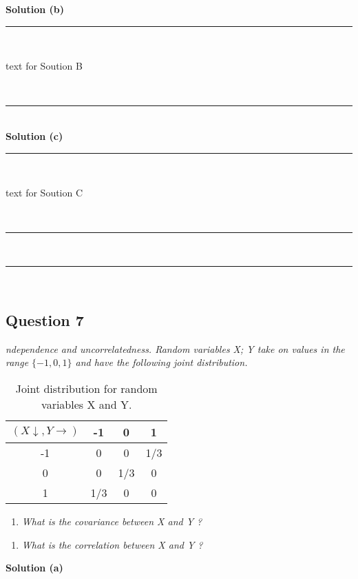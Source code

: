 \documentclass{article}
\begin{document}
\textbf{Solution (b)}

\noindent\rule{\textwidth}{0.4pt}\\

\parbox{\textwidth}{text for Soution B}\\

\noindent\rule{\textwidth}{0.4pt}\\

\textbf{Solution (c)}

\noindent\rule{\textwidth}{0.4pt}\\

\parbox{\textwidth}{text for Soution C}\\

\noindent\rule{\textwidth}{0.4pt}\\
\noindent\rule{\textwidth}{0.4pt}\\

\newpage

\subsection*{Question 7}
\textit{ndependence and uncorrelatedness. Random variables X; Y take on values in the range $\{-1,0,1\}$ and have the following joint distribution.}\\

\begin{table}[h]
\centering
\begin{tabular}{c|ccc}
  $(X\downarrow ,Y \rightarrow)$ & -1 & 0 & 1 \\ \hline
-1 & 0 & 0 & 1/3 \\
 0 & 0 & 1/3 & 0 \\
 1 & 1/3 & 0 & 0 \\
\end{tabular}
\caption{Joint distribution for random variables X and Y.}
\label{tab:example_fractions}
\end{table}

\begin{enumerate}[label=(a)]
  \item \textit{What is the covariance between X and Y ?}
\end{enumerate}

\begin{enumerate}[label=(b)]
  \item \textit{What is the correlation between X and Y ?}
\end{enumerate}

\textbf{Solution (a)}
\end{document}
